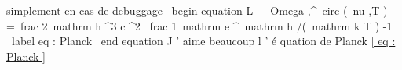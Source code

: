 simplement en cas de debuggage
\ begin { equation }
  L _{\ Omega ,\nu }^{\ circ } (\ nu ,T ) =\ frac {2\ mathrm { h } \nu ^{3}}{
    c ^{2}} \ frac {1}{\ mathrm { e } ^{\ mathrm { h } \nu /(\ mathrm { k }
    T ) } -1}
  \ label { eq : Planck } %
\ end { equation }
J ’ aime beaucoup l ’ é quation de Planck \ref{ eq : Planck }

